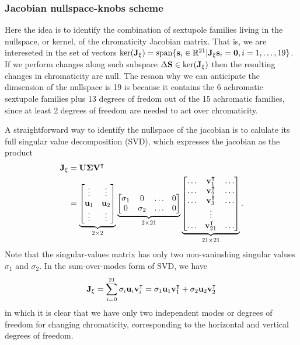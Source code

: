 \subsubsection{Jacobian nullspace-knobs scheme}
Here the idea is to identify the combination of sextupole families living in the nullspace, or kernel, of the chromaticity Jacobian matrix. That is, we are intereseted in the set of vectors $\text{ker}(\vb{J}_\xi)=\text{span}\{\vb{s}_i\in\mathbb{R}^{21}| \vb{J}_{\xi} \vb{s}_i = \vb{0}, i=1,\dots,19 \}$. If we perform changes along such subspace $\Delta \vb{S}\in\text{ker}(\vb{J}_\xi)$ then the resulting changes in chromaticity are null. The resaon why we can anticipate the dimsension of the nullspace is 19 is because it contains the 6 achromatic sextupole families plus 13 degrees of fredom out of the 15 achromatic families, since at least 2 degrees of freedom are needed to act over chromaticity.

A straightforward way to identify the nullspace of the jacobian is to calulate its full singular value decomposition (SVD), which expresses the jacobian as the product
\begin{equation}
    \begin{aligned}
        \vb{J}_\xi &= \vb{U}\boldsymbol{\Sigma}\vb{V}^\intercal\\
                   &= \underbrace{\mqty[\vdots & \vdots \\
                            \vb{u}_1 & \vb{u}_2\\
                            \vdots & \vdots]}_{2\times 2}
                            \underbrace{\mqty[\sigma_1 & 0 & \dots & 0\\
                                             0 & \sigma_2 & \dots & 0 ]}_{2\times21}
                            \underbrace{\mqty[
                                \dots & \vb{v}^\intercal_1 & \dots\\
                                \dots & \vb{v}^\intercal_2 & \dots\\
                                \dots & \vb{v}^\intercal_3 & \dots\\
                                      & \vdots &    \\
                                \dots & \vb{v}^\intercal_{21} & \dots\\                              ]}_{21\times21}.
    \end{aligned}
\end{equation}
Note that the singular-values matrix has only two non-vaninshing singular values $\sigma_1$ and $\sigma_2$. In the sum-over-modes form of SVD, we have
\begin{equation}
    \vb{J}_\xi = \sum_{i=0}^{21}\sigma_i\vb{u}_i\vb{v}_{i}^{\intercal} = \sigma_1 \vb{u}_1\vb{v}_{1}^\intercal + \sigma_2 \vb{u}_2\vb{v}_{2}^\intercal
\end{equation}
in which it is clear that we have only two independent modes or degrees of freedom for changing chromaticity, corresponding to the horizontal and vertical degrees of freedom.

